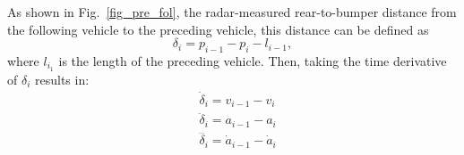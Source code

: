 \documentclass[letterpaper, 10 pt, conference]{ieeeconf}  %
\begin{document}

As shown in Fig.~\ref{fig_pre_fol}, the radar-measured rear-to-bumper distance from the following vehicle to the preceding vehicle, this distance can be defined as
\begin{equation} \label{distance_error}
    \delta_{i}=p_{i-1}-p_{i}-l_{i-1},
\end{equation}
where $l_{i_1}$ is the length of the preceding vehicle. {\color{red} Then, taking the time derivative of $\delta_i$ results in:}
\begin{equation} \label{error_state}
    \begin{aligned}
        & \dot{\delta}_i={v}_{i-1}-{v}_i \\
        & \ddot{\delta}_i={a}_{i-1}-{a}_i \\
        & \dddot{\delta_{i}}=\dot{a}_{i-1}-\dot{a}_i
    \end{aligned}
\end{equation}
\end{document}
